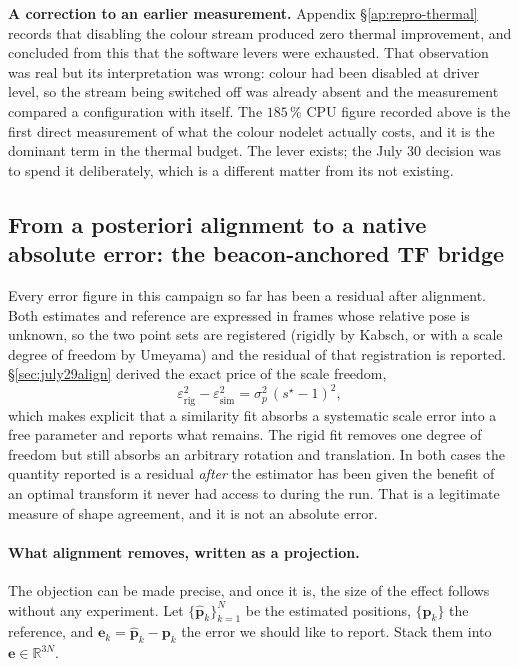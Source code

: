 \noindent\textbf{A correction to an earlier measurement.} Appendix
\S\ref{ap:repro-thermal} records that disabling the colour stream produced
zero thermal improvement, and concluded from this that the software levers
were exhausted. That observation was real but its interpretation was wrong:
colour had been disabled at driver level, so the stream being switched off
was already absent and the measurement compared a configuration with itself.
The $185\,\%$ CPU figure recorded above is the first direct measurement of
what the colour nodelet actually costs, and it is the dominant term in the
thermal budget. The lever exists; the July 30 decision was to spend it
deliberately, which is a different matter from its not existing.

\subsection{From a posteriori alignment to a native absolute error: the
beacon-anchored TF bridge}
\label{sec:july30bridge}

Every error figure in this campaign so far has been a residual after
alignment. Both estimates and reference are expressed in frames whose
relative pose is unknown, so the two point sets are registered (rigidly by
Kabsch, or with a scale degree of freedom by Umeyama) and the residual of
that registration is reported. \S\ref{sec:july29align} derived the exact
price of the scale freedom,
\begin{equation}
\varepsilon^{2}_{\mathrm{rig}} - \varepsilon^{2}_{\mathrm{sim}}
  = \sigma_{p}^{2}\,(s^{\star}-1)^{2},
\label{eq:july30scaleprice}
\end{equation}
which makes explicit that a similarity fit absorbs a systematic scale error
into a free parameter and reports what remains. The rigid fit removes one
degree of freedom but still absorbs an arbitrary rotation and translation.
In both cases the quantity reported is a residual \emph{after} the estimator
has been given the benefit of an optimal transform it never had access to
during the run. That is a legitimate measure of shape agreement, and it is
not an absolute error.

\paragraph{What alignment removes, written as a projection.}
The objection can be made precise, and once it is, the size of the effect
follows without any experiment. Let $\{\hat{\mathbf{p}}_k\}_{k=1}^{N}$ be the
estimated positions, $\{\mathbf{p}_k\}$ the reference, and
$\mathbf{e}_k = \hat{\mathbf{p}}_k - \mathbf{p}_k$ the error we should like to
report. Stack them into $\mathbf{e} \in \mathbb{R}^{3N}$.

